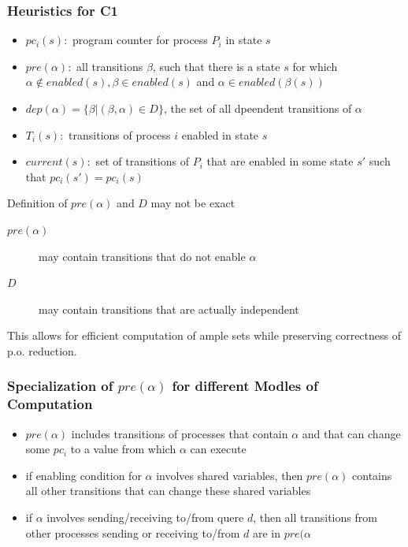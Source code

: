 \documentclass[a4paper, 10pt]{article}
\begin{document}
\subsubsection*{Heuristics for C1}
\begin{itemize}
    \item $pc_i(s):$ program counter for process $P_i$ in state $s$
    \item $pre(\alpha):$ all transitions $\beta$, such that there is a state $s$ for which $\alpha\not\in enabled(s),\beta\in enabled(s)$ and $\alpha\in enabled(\beta(s))$
    \item $dep(\alpha)=\{\beta|(\beta,\alpha)\in D\}$, the set of all dpeendent transitions of $\alpha$
    \item $T_i(s):$ transitions of process $i$ enabled in state $s$
    \item $current(s):$ set of transitions of $P_i$ that are enabled in some state $s'$ such that $pc_i(s')=pc_i(s)$
\end{itemize}
Definition of $pre(\alpha)$ and $D$ may not be exact
\begin{description}
    \item[$pre(\alpha)$] may contain transitions that do not enable $\alpha$
    \item[$D$] may contain transitions that are actually independent
\end{description}
This allows for efficient computation of ample sets while preserving correctness of p.o. reduction.
\subsubsection*{Specialization of $pre(\alpha)$ for different Modles of Computation}
\begin{itemize}
    \item $pre(\alpha)$ includes transitions of processes that contain $\alpha$ and that can change some $pc_i$ to a value from which $\alpha$ can execute
    \item if enabling condition for $\alpha$ involves shared variables, then $pre(\alpha)$ contains all other transitions that can change these shared variables
    \item if $\alpha$ involves sending/receiving to/from quere $d$, then all transitions from other processes sending or receiving to/from $d$ are in $pre(\alpha$
\end{itemize}
\end{document}
